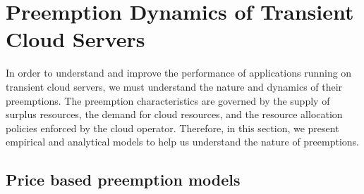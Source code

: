 \section{Preemption Dynamics of Transient Cloud Servers}


In order to understand and improve the performance of applications running on transient cloud servers, we must understand the nature and dynamics of their preemptions.
The preemption characteristics are governed by the supply of surplus resources, the demand for cloud resources, and the resource allocation policies enforced by the cloud operator.
Therefore, in this section, we present empirical and analytical models to help us understand the nature of preemptions. 








\subsection{Price based preemption models}

